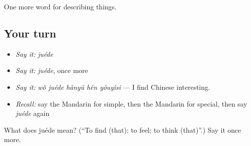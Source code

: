 \begin{grammarlens}[title={What you've built}]
One more word for describing things.
\end{grammarlens}

\subsection*{Your turn}
\begin{itemize}
\raggedright
  \item \emph{Say it:} \emph{juéde}
  \item \emph{Say it:} \emph{juéde}, once more
  \item \emph{Say it:} \emph{wǒ juéde hànyǔ hěn yǒuyìsi} — I find Chinese interesting.
  \item \emph{Recall:} say the Mandarin for simple, then the Mandarin for special, then say \emph{juéde} again
\end{itemize}

\begin{tcolorbox}[breakable,colback=teal!4,colframe=teal!35!black,title={Before you move on}]
What does juéde mean? (\textquotedblleft{}To find (that); to feel; to think (that)\textquotedblright{}.) Say it once more.
\end{tcolorbox}
